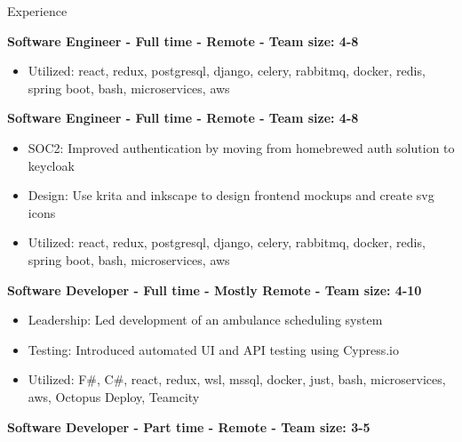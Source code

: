 \documentclass{resume} %
\begin{document}
\begin{rSection}{Experience}

\textbf{Software Engineer - Full time - Remote - Team size: 4-8} \\

\begin{itemize}
  \itemsep -2pt {}
      \item Utilized: react, redux, postgresql, django, celery, rabbitmq, docker, redis, spring boot, bash, microservices, aws
\end{itemize}

\textbf{Software Engineer - Full time - Remote - Team size: 4-8} \\

\begin{itemize}
  \itemsep -2pt {}
      \item SOC2: Improved authentication by moving from homebrewed auth solution to keycloak
    \item Design: Use krita and inkscape to design frontend mockups and create svg icons
    \item Utilized: react, redux, postgresql, django, celery, rabbitmq, docker, redis, spring boot, bash, microservices, aws
\end{itemize}

\textbf{Software Developer - Full time - Mostly Remote - Team size: 4-10} \\

\begin{itemize}
  \itemsep -2pt {}
      \item Leadership: Led development of an ambulance scheduling system
    \item Testing: Introduced automated UI and API testing using Cypress.io
    \item Utilized: F\#, C\#, react, redux, wsl, mssql, docker, just, bash, microservices, aws, Octopus Deploy, Teamcity
\end{itemize}

\textbf{Software Developer - Part time - Remote - Team size: 3-5} \\


\end{rSection}
\end{document}
